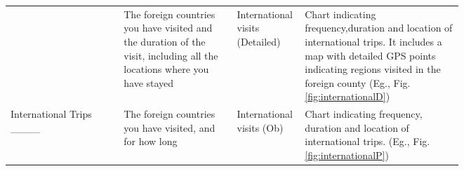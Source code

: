 \begin{table*}[ht!]
\begin{tabularx}{\textwidth}{|l|p{0.25\linewidth}|p{0.15\linewidth}|p{0.35\linewidth}|}
& The foreign countries you have visited and   the duration of the visit, including all the locations where you have stayed    & International visits (Detailed)
& Chart indicating frequency,duration and location of international trips. It includes a map with detailed GPS points indicating regions visited in the foreign county (Eg., Fig. \ref{fig:internationalD})\\ \cline{2-4} 
\multirow{-2}{*}{International Trips ____ }                & The foreign countries you have visited, and for how long& International visits (Ob)& Chart indicating frequency, duration and location of international trips. (Eg., Fig. \ref{fig:internationalP})                          \\ \cline{1-4} 

\end{tabularx}
\label{tab:listOfFeatures}
\end{table*}